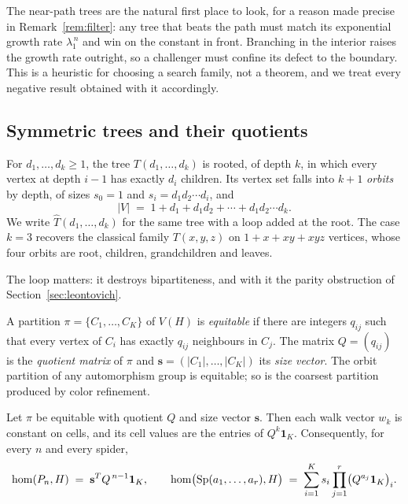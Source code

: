 \begin{remark}
  \label{rem:why-nearpath}
  The near-path trees are the natural first place to look, for a reason
  made precise in Remark~\ref{rem:filter}: any tree that beats the path must
  match its exponential growth rate $\lambda_1^{\,n}$ and win on the
  constant in front. Branching in the interior raises the growth rate
  outright, so a challenger must confine its defect to the boundary.
  This is a heuristic for choosing a search family, not a theorem, and
  we treat every negative result obtained with it accordingly.
\end{remark}

\subsection{Symmetric trees and their quotients}

\begin{definition}
  \label{def:symtree}
  For $d_1,\dots,d_k \ge 1$, the tree $T(d_1,\dots,d_k)$ is rooted, of
  depth $k$, in which every vertex at depth $i-1$ has exactly $d_i$
  children. Its vertex set falls into $k+1$ \emph{orbits} by depth, of
  sizes $s_0 = 1$ and $s_i = d_1 d_2 \cdots d_i$, and
  \[
    |V| \;=\; 1 + d_1 + d_1 d_2 + \cdots + d_1 d_2 \cdots d_k .
  \]
  We write $\hat T(d_1,\dots,d_k)$ for the same tree with a loop added at
  the root. The case $k = 3$ recovers the classical family
  $T(x,y,z)$ on $1 + x + xy + xyz$ vertices, whose four orbits are root,
  children, grandchildren and leaves.
\end{definition}

The loop matters: it destroys bipartiteness, and with it the parity
obstruction of Section~\ref{sec:leontovich}.

\begin{definition}
  \label{def:quotient}
  A partition $\pi = \{C_1,\dots,C_K\}$ of $V(H)$ is \emph{equitable} if
  there are integers $q_{ij}$ such that every vertex of $C_i$ has exactly
  $q_{ij}$ neighbours in $C_j$. The matrix $Q = (q_{ij})$ is the
  \emph{quotient matrix} of $\pi$ and $\mathbf{s} = (|C_1|,\dots,|C_K|)$
  its \emph{size vector}. The orbit partition of any automorphism group
  is equitable; so is the coarsest partition produced by color refinement.
\end{definition}

\begin{lemma}
  \label{lem:quotient}
  Let $\pi$ be equitable with quotient $Q$ and size vector $\mathbf{s}$.
  Then each walk vector $w_k$ is constant on cells, and its cell values
  are the entries of $Q^k \mathbf{1}_K$. Consequently, for every $n$ and
  every spider,
  \[
    \mathrm{hom}(P_n,H) \;=\; \mathbf{s}^{T} Q^{\,n-1}\mathbf{1}_K,
    \qquad
    \mathrm{hom}\bigl(\operatorname{Sp}(a_1,\dots,a_r),H\bigr)
      \;=\; \sum_{i=1}^{K} s_i \prod_{j=1}^{r} \bigl(Q^{a_j}\mathbf{1}_K\bigr)_i .
  \]
\end{lemma}

